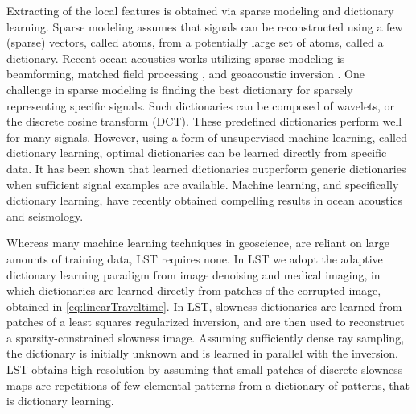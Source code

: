 Extracting of the local features is obtained via sparse modeling and dictionary learning.
Sparse modeling assumes that signals can be reconstructed using a few (sparse) vectors, called atoms, from a potentially large set of atoms, called a dictionary. Recent ocean acoustics works utilizing sparse modeling is beamforming\cite{Xenaki2014}, matched field processing \cite{Gemba2017}, and geoacoustic inversion \cite{gerstoft2018}. One challenge in sparse modeling is finding the best dictionary for sparsely representing specific signals. Such dictionaries can be composed of wavelets, or the discrete cosine transform (DCT). These predefined dictionaries perform well for many signals. However, using a form of unsupervised machine learning, called dictionary learning, optimal dictionaries can be learned directly from specific data\cite{mallat1999}. It has been shown that learned dictionaries outperform generic dictionaries when sufficient signal examples are available. Machine learning, and specifically dictionary learning, have recently obtained compelling results in ocean acoustics \cite{Bianco2017} and seismology\cite{kong2018}. 



Whereas many machine learning techniques in geoscience\cite{kong2018}, are reliant on large amounts of training data, LST\cite{bianco2018} requires none. In LST we adopt the adaptive dictionary learning paradigm from image denoising \cite{elad2010} and medical imaging\cite{ravishankar2011}, in which dictionaries are learned directly from patches of the corrupted image, obtained in \eqref{eq:linearTraveltime}. In LST, slowness dictionaries are learned from patches of a least squares regularized inversion, and are then used to reconstruct a sparsity-constrained slowness image. Assuming sufficiently dense ray sampling, the dictionary is initially unknown and is learned in parallel with the inversion. LST\cite{bianco2018} obtains high resolution by assuming that small patches of discrete slowness maps are repetitions of few elemental patterns from a dictionary of patterns, that is dictionary learning. 

